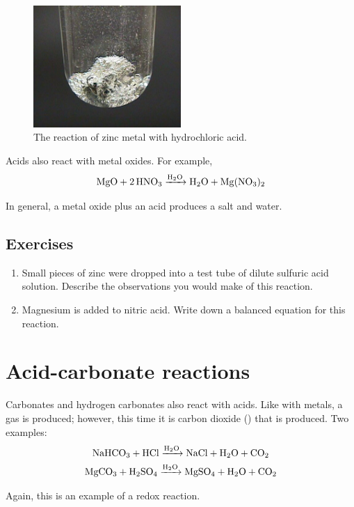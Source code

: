 \documentclass[a4paper]{memoir}
\begin{document}
\begin{figure}
  \centering
  \includegraphics[width=0.5\textwidth]{zncl}
  \caption{The reaction of zinc metal with hydrochloric acid.\label{fig:zncl}}
\end{figure}

Acids also react with metal oxides. For example,
\begin{equation}
  \ce{MgO + 2HNO3 ->[H2O] H2O + Mg(NO3)2}
\end{equation}

In general, a metal oxide plus an acid produces a salt and water.

\subsection*{Exercises}
\begin{enumerate}
  \item Small pieces of zinc were dropped into a test tube of dilute sulfuric acid solution. Describe the observations you would make of this reaction.
  \item Magnesium is added to nitric acid. Write down a balanced equation for this reaction.
\end{enumerate}

\section{Acid-carbonate reactions}
Carbonates and hydrogen carbonates also react with acids. Like with metals, a gas is produced; however, this time it is carbon
dioxide () that is produced. Two examples:
\begin{gather}
  \ce{NaHCO3 + HCl ->[H2O] NaCl + H2O + CO2}\\
  \ce{MgCO3 + H2SO4 ->[H2O] MgSO4 + H2O + CO2}
\end{gather}

Again, this is an example of a redox reaction.
\end{document}
